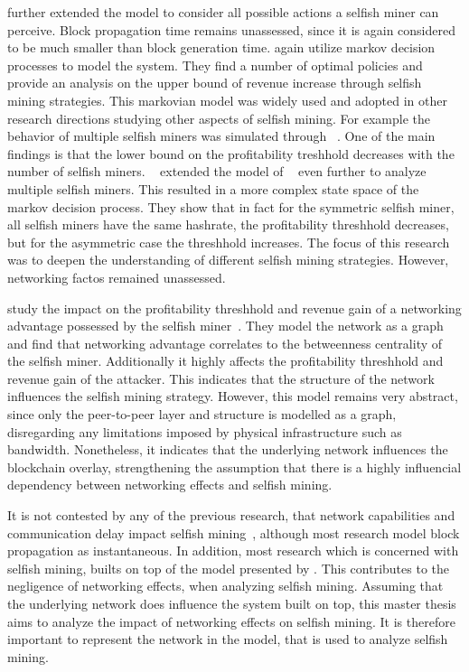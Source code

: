 \citeauthor{optimal_sm} further extended the model to consider all possible actions a selfish miner can perceive. Block propagation time remains unassessed, since it is again considered to be much smaller than block generation time.  \citeauthor{optimal_sm} again utilize markov decision processes to model the system. They find a number of optimal policies and provide an analysis on the upper bound of revenue increase through selfish mining strategies.
This markovian model was widely used and adopted in other research directions studying other aspects of selfish mining. For example the behavior of multiple selfish miners was simulated through \citeauthor{multi_sm}~\cite{multi_sm}. One of the main findings is that the lower bound on the profitability treshhold decreases with the number of selfish miners.
\citeauthor{deepDiveSM}~\cite{deepDiveSM} extended the model of \citeauthor{optimal_sm}~\cite{optimal_sm} even further to analyze multiple selfish miners. This resulted in a more complex state space of the markov decision process. They show that in fact for the symmetric selfish miner, all selfish miners have the same hashrate, the profitability threshhold decreases, but for the asymmetric case the threshhold increases. The focus of this research was to deepen the understanding of different selfish mining strategies. However, networking factos remained unassessed.

\citeauthor{xiao_modeling} study the impact on the profitability threshhold and revenue gain of a networking advantage possessed by the selfish miner~\cite{xiao_modeling}. They model the network as a graph and find that networking advantage correlates to the betweenness centrality of the selfish miner. Additionally it highly affects the profitability threshhold and revenue gain of the attacker. This indicates that the structure of the network influences the selfish mining strategy. However, this model remains very abstract, since only the peer-to-peer layer and structure is modelled as a graph, disregarding any limitations imposed by physical infrastructure such as bandwidth. Nonetheless, it indicates that the underlying network influences the blockchain overlay, strengthening the assumption that there is a highly influencial dependency between networking effects and selfish mining.

It is not contested by any of the previous research, that network capabilities and communication delay impact selfish mining~\cite{multi_sm}, although most research model block propagation as instantaneous.
In addition, most research which is concerned with selfish mining, builts on top of the model presented by \citeauthor{optimal_sm}.
This contributes to the negligence of networking effects, when analyzing selfish mining.
Assuming that the underlying network does influence the system built on top, this master thesis aims to analyze the impact of networking effects on selfish mining. It is therefore important to represent the network in the model, that is used to analyze selfish mining.

